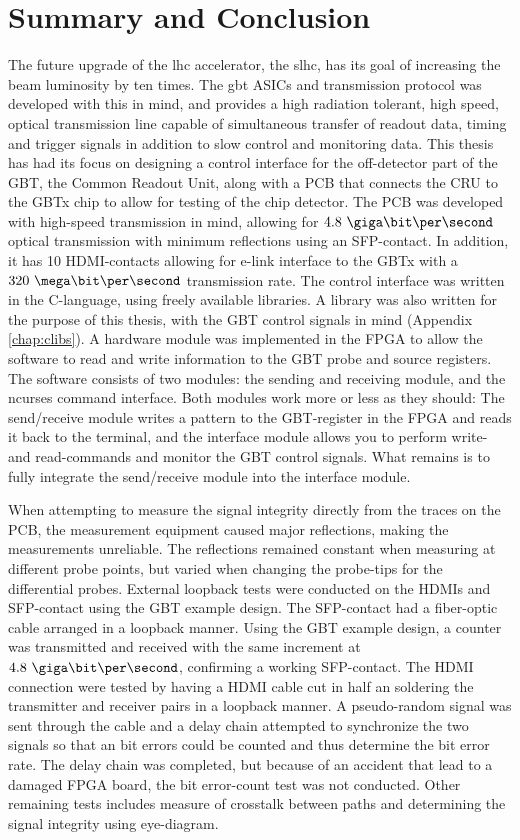 \documentclass[main.tex]{subfiles}
\begin{document}
\chapter{Summary and Conclusion}

The future upgrade of the \acrlong{lhc} accelerator, the \acrlong{slhc}, has its goal of increasing the beam luminosity by ten times. The \acrlong{gbt} ASICs and transmission protocol was developed with this in mind, and provides a high radiation tolerant, high speed, optical transmission line capable of simultaneous transfer of readout data, timing and trigger signals in addition to slow control and monitoring data. This thesis has had its focus on designing a control interface for the off-detector part of the GBT, the Common Readout Unit, along with a PCB that connects the CRU to the GBTx chip to allow for testing of the chip detector. The PCB was developed with high-speed transmission in mind, allowing for $4.8~\giga\bit\per\second$ optical transmission with minimum reflections using an SFP-contact. In addition, it has 10 HDMI-contacts allowing for e-link interface to the GBTx with a $320~\mega\bit\per\second$ transmission rate. The control interface was written in the C-language, using freely available libraries. A library was also written for the purpose of this thesis, with the GBT control signals in mind (Appendix \ref{chap:clibs}). A hardware module was implemented in the FPGA to allow the software to read and write information to the GBT probe and source registers. The software consists of two modules: the sending and receiving module, and the ncurses command interface. Both modules work more or less as they should: The send/receive module writes a pattern to the GBT-register in the FPGA and reads it back to the terminal, and the interface module allows you to perform write- and read-commands and monitor the GBT control signals. What remains is to fully integrate the send/receive module into the interface module.

When attempting to measure the signal integrity directly from the traces on the PCB, the measurement equipment caused major reflections, making the measurements unreliable. The reflections remained constant when measuring at different probe points, but varied when changing the probe-tips for the differential probes. External loopback tests were conducted on the HDMIs and SFP-contact using the GBT example design. The SFP-contact had a fiber-optic cable arranged in a loopback manner. Using the GBT example design, a counter was transmitted and received with the same increment at $4.8~\giga\bit\per\second$, confirming a working SFP-contact. The HDMI connection were tested by having a HDMI cable cut in half an soldering the transmitter and receiver pairs in a loopback manner. A pseudo-random signal was sent through the cable and a delay chain attempted to synchronize the two signals so that an bit errors could be counted and thus determine the bit error rate. The delay chain was completed, but because of an accident that lead to a damaged FPGA board, the bit error-count test was not conducted. Other remaining tests includes measure of crosstalk between paths and determining the signal integrity using eye-diagram. 
\end{document}
